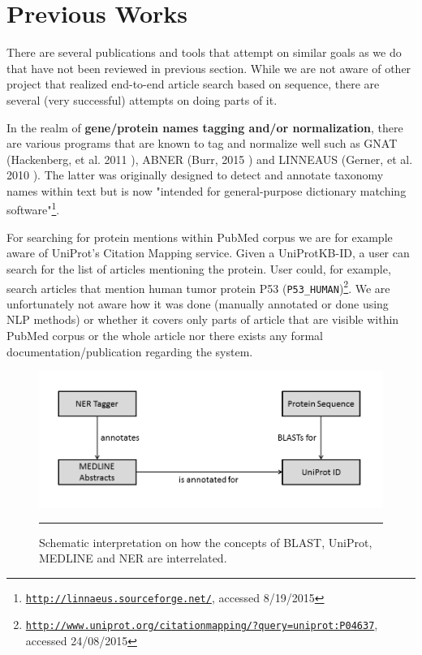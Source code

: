 
\section{Previous Works}

There are several publications and tools that attempt on similar goals as we do that have not been reviewed in previous section. While we are not aware of other project that realized end-to-end article search based on sequence, there are several (very successful) attempts on doing parts of it.

In the realm of \textbf{gene/protein names tagging and/or normalization}, there are various programs that are known to tag and normalize well such as GNAT (Hackenberg, et al. 2011 \citep{hakenberg2011gnat}), ABNER (Burr, 2015 \citep{settles2005abner}) and LINNEAUS (Gerner, et al. 2010 \citep{gerner2010linnaeus}). The latter was originally designed to detect and annotate taxonomy names within text but is now "intended for general-purpose dictionary matching software"\footnote{\href{http://linnaeus.sourceforge.net/}{\texttt{http://linnaeus.sourceforge.net/}}, accessed 8/19/2015}.

For searching for protein mentions within PubMed corpus we are for example aware of UniProt's Citation Mapping service. Given a UniProtKB-ID, a user can search for the list of articles mentioning the protein. User could, for example, search articles that mention human tumor protein P53 (\texttt{P53\_HUMAN})\footnote{\href{http://www.uniprot.org/citationmapping/?query=uniprot:P04637}{\texttt{http://www.uniprot.org/citationmapping/?query=uniprot:P04637}}, accessed 24/08/2015}. We are unfortunately not aware how it was done (manually annotated or done using NLP methods) or whether it covers only parts of article that are visible within PubMed corpus or the whole article nor there exists any formal documentation/publication regarding the system.

\begin{figure}[htbp]
  \centering
    \includegraphics[width=6in]{Figures/component_graph.png}
    \rule{35em}{0.5pt}
  \caption[Schematic interaction between BLAST, UniProt, MEDLINE and NER Tagger]{Schematic interpretation on how the concepts of BLAST, UniProt, MEDLINE and NER are interrelated.}
  \label{fig:SchematicInteraction}
\end{figure}